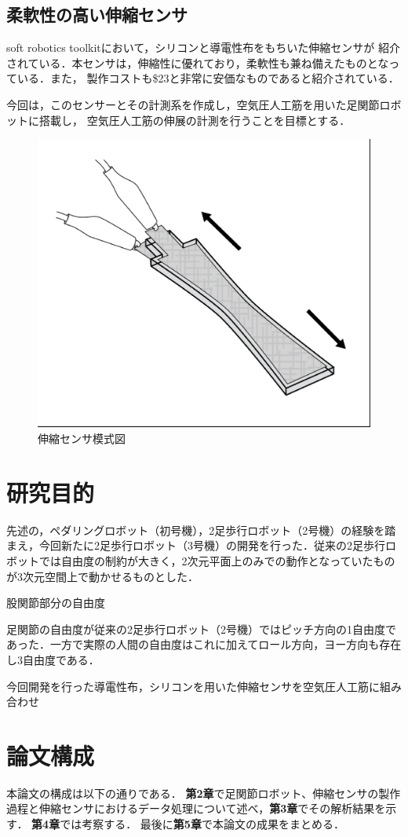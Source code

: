 \newpage

\subsection{柔軟性の高い伸縮センサ}%
soft robotics toolkit\cite{MITSoftRobot}において，シリコンと導電性布をもちいた伸縮センサが
紹介されている．本センサは，伸縮性に優れており，柔軟性も兼ね備えたものとなっている．また，
製作コストも\$23と非常に安価なものであると紹介されている．

今回は，このセンサーとその計測系を作成し，空気圧人工筋を用いた足関節ロボットに搭載し，
空気圧人工筋の伸展の計測を行うことを目標とする．
\begin{figure}[h]
    \begin{center}
        \includegraphics[width=0.5\columnwidth]{./MITSoftRobotics.eps}
        \caption{伸縮センサ模式図\cite{MITSoftRobot}}
        \label{MITSoftRobot表紙}
    \end{center}
\end{figure}


\section{研究目的}

先述の，ペダリングロボット（初号機），2足歩行ロボット（2号機）の経験を踏まえ，今回新たに2足歩行ロボット（3号機）の開発を行った．従来の2足歩行ロボットでは自由度の制約が大きく，2次元平面上のみでの動作となっていたものが3次元空間上で動かせるものとした．

股関節部分の自由度

足関節の自由度が従来の2足歩行ロボット（2号機）ではピッチ方向の1自由度であった．一方で実際の人間の自由度はこれに加えてロール方向，ヨー方向も存在し3自由度である．

今回開発を行った導電性布，シリコンを用いた伸縮センサを空気圧人工筋に組み合わせ


\section{論文構成}
本論文の構成は以下の通りである．
{\bf 第2章}で足関節ロボット、伸縮センサの製作過程と伸縮センサにおけるデータ処理について述べ，{\bf 第3章}でその解析結果を示す．
{\bf 第4章}では考察する． %
最後に{\bf 第5章}で本論文の成果をまとめる．
